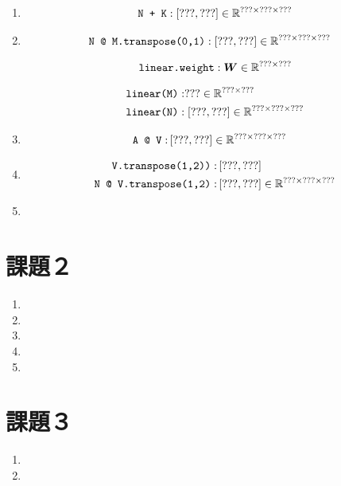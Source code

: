 \documentclass{jarticle}
\begin{document}
\begin{enumerate}
 \item 
	\begin{align*}
	 \text{\tt N + K}:  
	 \left[
	 ???, 
	 ???
	 \right] 
	 \in \mathbb{R}^{??? \times ??? \times ???}	 
	\end{align*}

 \item 
	\begin{align*}
	 \text{\tt N @ M.transpose(0,1)}
	 &: 
	 \left[
	 ???, 
	 ???
	 \right] 
	 \in \mathbb{R}^{??? \times ??? \times ???}	 	 
	\end{align*}

	\begin{align*}
	 \text{\tt linear.weight}: \bm W \in \mathbb{R}^{??? \times ???}
	\end{align*}

	\begin{align*}
	 \text{\tt linear(M)} &: 
	 ???
	 \in \mathbb{R}^{??? \times ???}
	 \\
	 \text{\tt linear(N)} &:  
	 	 \left[
	 ???,
	 ???
	 \right]
	 \in \mathbb{R}^{??? \times ??? \times ???}
	\end{align*}

 \item 
	\begin{align*}
	 \text{\tt A @ V}: &
	 \left[
	 ???,
	 ???
	 \right]
	 \in \mathbb{R}^{??? \times ??? \times ???}
	\end{align*}

 \item 
	\begin{align*}
	 \text{\tt V.transpose(1,2))}: &
	 \left[
	 ???,
	 ???
	 \right]	 
	 \\
	 \text{\tt N @ V.transpose(1,2)}: &
	 \left[
	 ???,
	 ???
	 \right]
	 \in \mathbb{R}^{??? \times ??? \times ???}
	\end{align*}

 \item 
\end{enumerate}

\section*{課題２}

\begin{enumerate}
 \item 
 \item 
 \item 
 \item 
 \item 
\end{enumerate}

\section*{課題３}

\begin{enumerate}
 \item 
 \item 
\end{enumerate}
\end{document}
